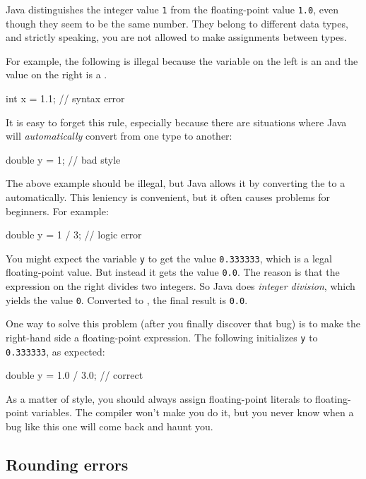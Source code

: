 Java distinguishes the integer value {\tt 1} from the floating-point value {\tt 1.0}, even though they seem to be the same number.
They belong to different data types, and strictly speaking, you are not allowed to make assignments between types.

For example, the following is illegal because the variable on the left is an  and the value on the right is a .

\begin{code}
    int x = 1.1;  // syntax error
\end{code}

It is easy to forget this rule, especially because there are situations where Java will {\em automatically} convert from one type to another:

\begin{code}
    double y = 1;  // bad style
\end{code}

The above example should be illegal, but Java allows it by converting the  to a  automatically.
This leniency is convenient, but it often causes problems for beginners. For example:

\begin{code}
    double y = 1 / 3;  // logic error
\end{code}


You might expect the variable {\tt y} to get the value {\tt 0.333333}, which is a legal floating-point value.
But instead it gets the value {\tt 0.0}.
The reason is that the expression on the right divides two integers.
So Java does {\em integer division}, which yields the value {\tt 0}.
Converted to , the final result is {\tt 0.0}.

One way to solve this problem (after you finally discover that bug) is to make the right-hand side a floating-point expression.
The following initializes {\tt y} to {\tt 0.333333}, as expected:

\begin{code}
    double y = 1.0 / 3.0;  // correct
\end{code}

As a matter of style, you should always assign floating-point literals to floating-point variables.
The compiler won't make you do it, but you never know when a bug like this one will come back and haunt you.

\subsection{Rounding errors}

